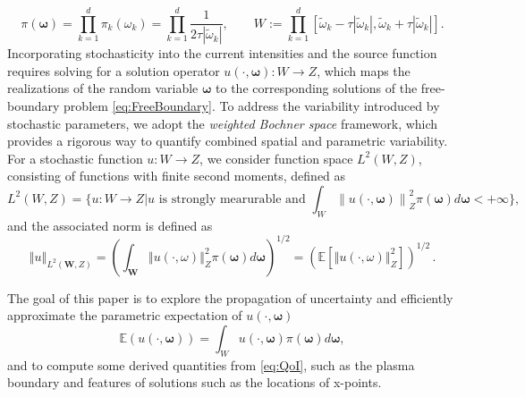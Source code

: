 \documentclass[final,3p,times,11pt]{elsarticle}
\begin{document}
%
\begin{equation}
\label{eq:ParameterSpace}
 \pi \left(\boldsymbol{\omega}\right)=\prod_{k=1}^{d} \pi_k\left(\omega_{k}\right)=\prod_{k=1}^{d} \frac{1}{2\tau |\widetilde{\omega}_k|}, \qquad  
    W := \prod_{k=1}^{d}\left[\widetilde{\omega}_k-\tau \left\vert \widetilde{\omega}_k\right\vert,\widetilde{\omega}_k+\tau \left\vert \widetilde{\omega}_k \right\vert\right].
\end{equation}
%
Incorporating stochasticity into the current intensities and the source function requires solving for a solution operator $u(\cdot, \boldsymbol{\omega}): W \to Z$, which maps the realizations of the random variable $\boldsymbol \omega$ to the corresponding solutions of the free-boundary problem \eqref{eq:FreeBoundary}. To address the variability introduced by stochastic parameters, we adopt the {\it weighted Bochner space} framework, which provides a rigorous way to quantify combined spatial and parametric variability. For a stochastic function $u: W\to Z$, we consider function space $L^2(W,Z)$, consisting of functions with finite second moments, defined as
%
\[
L^2(W,Z) = \{u:W\rightarrow Z\big\vert u \text{ is strongly mearurable and }\int_{W}\left\|u(\cdot,\boldsymbol{\omega})\right\|_{Z}^2\pi(\boldsymbol{\omega})d\boldsymbol{\omega}<+\infty\},
\]
%
and the associated norm is defined as
\[
\left\Vert u \right\Vert_{L^2(\boldsymbol W,Z)} =
    \left(\int_{\boldsymbol W} \left\Vert u(\cdot,\omega)  \right\Vert_{Z}^2 \pi(\boldsymbol{\omega})d\boldsymbol{\omega} \right)^{1/2} = \left(\mathbb{E}\left[\left\Vert u(\cdot,\omega)  \right\Vert_{Z}^2\right]\right)^{1/2}\,. 
\]

The goal of this paper is to explore the propagation of uncertainty and efficiently approximate the parametric expectation of $u(\cdot,\boldsymbol \omega)$
%
 \begin{equation}
 \label{eq:QoI}
      \mathbb{E}\left(u(\cdot,\boldsymbol \omega)\right)=\int_W u(\cdot,\boldsymbol{\omega})\pi(\boldsymbol\omega)d\boldsymbol{\omega},
 \end{equation}
%
and to compute some derived quantities from \eqref{eq:QoI}, such as the plasma boundary and features of solutions such as the locations of x-points. 
\end{document}
